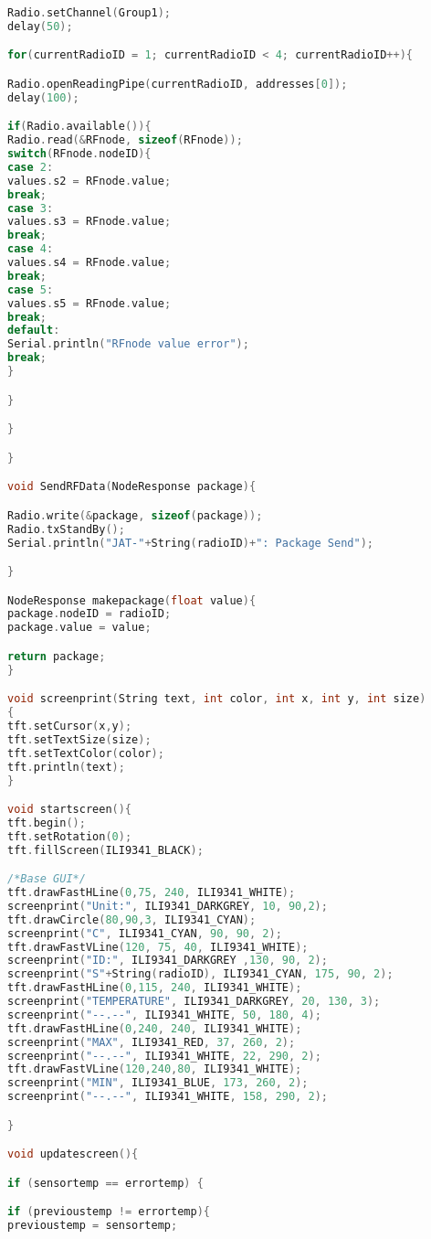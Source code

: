 \begin{lstlisting}[language=C++, caption={Firmware de nuestro prototipo en su versión 1.0}, captionpos=b, basicstyle=\small]
Radio.setChannel(Group1);
delay(50);

for(currentRadioID = 1; currentRadioID < 4; currentRadioID++){

Radio.openReadingPipe(currentRadioID, addresses[0]);
delay(100);

if(Radio.available()){
Radio.read(&RFnode, sizeof(RFnode));
switch(RFnode.nodeID){
case 2:
values.s2 = RFnode.value;
break;
case 3:
values.s3 = RFnode.value;
break;
case 4:
values.s4 = RFnode.value;
break;
case 5:
values.s5 = RFnode.value;
break;
default:
Serial.println("RFnode value error");
break;
}

}

}

}

void SendRFData(NodeResponse package){

Radio.write(&package, sizeof(package));
Radio.txStandBy();
Serial.println("JAT-"+String(radioID)+": Package Send");

}

NodeResponse makepackage(float value){
package.nodeID = radioID;
package.value = value;

return package;
}

void screenprint(String text, int color, int x, int y, int size)
{
tft.setCursor(x,y);
tft.setTextSize(size);
tft.setTextColor(color);
tft.println(text);
}

void startscreen(){
tft.begin();
tft.setRotation(0);
tft.fillScreen(ILI9341_BLACK);

/*Base GUI*/
tft.drawFastHLine(0,75, 240, ILI9341_WHITE);
screenprint("Unit:", ILI9341_DARKGREY, 10, 90,2);
tft.drawCircle(80,90,3, ILI9341_CYAN);
screenprint("C", ILI9341_CYAN, 90, 90, 2);
tft.drawFastVLine(120, 75, 40, ILI9341_WHITE);
screenprint("ID:", ILI9341_DARKGREY ,130, 90, 2);
screenprint("S"+String(radioID), ILI9341_CYAN, 175, 90, 2);
tft.drawFastHLine(0,115, 240, ILI9341_WHITE);
screenprint("TEMPERATURE", ILI9341_DARKGREY, 20, 130, 3);
screenprint("--.--", ILI9341_WHITE, 50, 180, 4);
tft.drawFastHLine(0,240, 240, ILI9341_WHITE);
screenprint("MAX", ILI9341_RED, 37, 260, 2);
screenprint("--.--", ILI9341_WHITE, 22, 290, 2);
tft.drawFastVLine(120,240,80, ILI9341_WHITE);
screenprint("MIN", ILI9341_BLUE, 173, 260, 2);
screenprint("--.--", ILI9341_WHITE, 158, 290, 2);

}

void updatescreen(){

if (sensortemp == errortemp) {

if (previoustemp != errortemp){
previoustemp = sensortemp;


\end{lstlisting}
